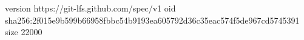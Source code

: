 version https://git-lfs.github.com/spec/v1
oid sha256:2f015e9b599b66958fbbc54b9193ea605792d36c35eac574f5de967cd5745391
size 22000
